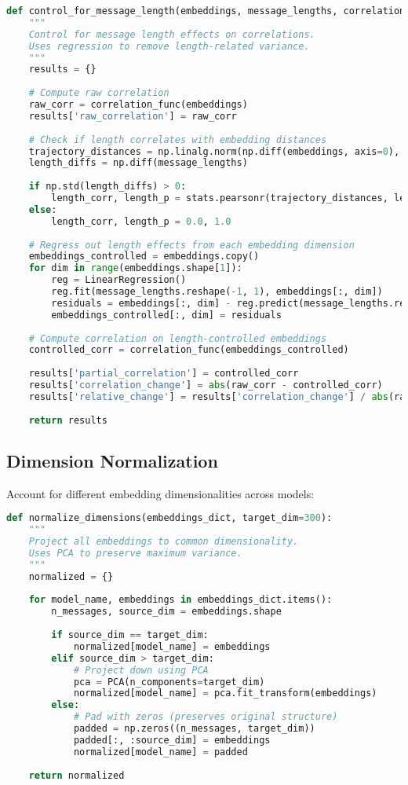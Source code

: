 \documentclass[11pt,letterpaper]{article}
\begin{document}
\begin{lstlisting}[language=Python]
def control_for_message_length(embeddings, message_lengths, correlation_func):
    """
    Control for message length effects on correlations.
    Uses regression to remove length-related variance.
    """
    results = {}
    
    # Compute raw correlation
    raw_corr = correlation_func(embeddings)
    results['raw_correlation'] = raw_corr
    
    # Check if length correlates with embedding distances
    trajectory_distances = np.linalg.norm(np.diff(embeddings, axis=0), axis=1)
    length_diffs = np.diff(message_lengths)
    
    if np.std(length_diffs) > 0:
        length_corr, length_p = stats.pearsonr(trajectory_distances, length_diffs[:-1])
    else:
        length_corr, length_p = 0.0, 1.0
    
    # Regress out length effects from each embedding dimension
    embeddings_controlled = embeddings.copy()
    for dim in range(embeddings.shape[1]):
        reg = LinearRegression()
        reg.fit(message_lengths.reshape(-1, 1), embeddings[:, dim])
        residuals = embeddings[:, dim] - reg.predict(message_lengths.reshape(-1, 1))
        embeddings_controlled[:, dim] = residuals
    
    # Compute correlation on length-controlled embeddings
    controlled_corr = correlation_func(embeddings_controlled)
    
    results['partial_correlation'] = controlled_corr
    results['correlation_change'] = abs(raw_corr - controlled_corr)
    results['relative_change'] = results['correlation_change'] / abs(raw_corr)
    
    return results
\end{lstlisting}

\subsection{Dimension Normalization}

Account for different embedding dimensionalities across models:

\begin{lstlisting}[language=Python]
def normalize_dimensions(embeddings_dict, target_dim=300):
    """
    Project all embeddings to common dimensionality.
    Uses PCA to preserve maximum variance.
    """
    normalized = {}
    
    for model_name, embeddings in embeddings_dict.items():
        n_messages, source_dim = embeddings.shape
        
        if source_dim == target_dim:
            normalized[model_name] = embeddings
        elif source_dim > target_dim:
            # Project down using PCA
            pca = PCA(n_components=target_dim)
            normalized[model_name] = pca.fit_transform(embeddings)
        else:
            # Pad with zeros (preserves original structure)
            padded = np.zeros((n_messages, target_dim))
            padded[:, :source_dim] = embeddings
            normalized[model_name] = padded
    
    return normalized
\end{lstlisting}
\end{document}
